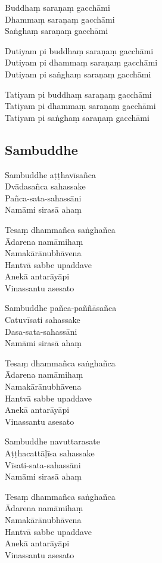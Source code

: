 \begin{paritta}
Buddhaṃ saraṇaṃ gacchāmi\\
Dhammaṃ saraṇaṃ gacchāmi\\
Saṅghaṃ saraṇaṃ gacchāmi

Dutiyam pi buddhaṃ saraṇaṃ gacchāmi\\
Dutiyam pi dhammaṃ saraṇaṃ gacchāmi\\
Dutiyam pi saṅghaṃ saraṇaṃ gacchāmi

Tatiyam pi buddhaṃ saraṇaṃ gacchāmi\\
Tatiyam pi dhammaṃ saraṇaṃ gacchāmi\\
Tatiyam pi saṅghaṃ saraṇaṃ gacchāmi
\end{paritta}

\subsection{Sambuddhe}
\label{sambuddhe}


\begin{paritta}
Sambuddhe aṭṭhavīsañca\\
Dvādasañca sahassake\\
Pañca-sata-sahassāni\\
Namāmi sirasā ahaṃ

Tesaṃ dhammañca saṅghañca\\
Ādarena namāmihaṃ\\
Namakārānubhāvena\\
Hantvā sabbe upaddave\\
Anekā antarāyāpi\\
Vinassantu asesato

Sambuddhe pañca-paññāsañca\\
Catuvīsati sahassake\\
Dasa-sata-sahassāni\\
Namāmi sirasā ahaṃ

Tesaṃ dhammañca saṅghañca\\
Ādarena namāmihaṃ\\
Namakārānubhāvena\\
Hantvā sabbe upaddave\\
Anekā antarāyāpi\\
Vinassantu asesato

Sambuddhe navuttarasate\\
Aṭṭhacattāḷīsa sahassake\\
Vīsati-sata-sahassāni\\
Namāmi sirasā ahaṃ

Tesaṃ dhammañca saṅghañca\\
Ādarena namāmihaṃ\\
Namakārānubhāvena\\
Hantvā sabbe upaddave\\
Anekā antarāyāpi\\
Vinassantu asesato
\end{paritta}

